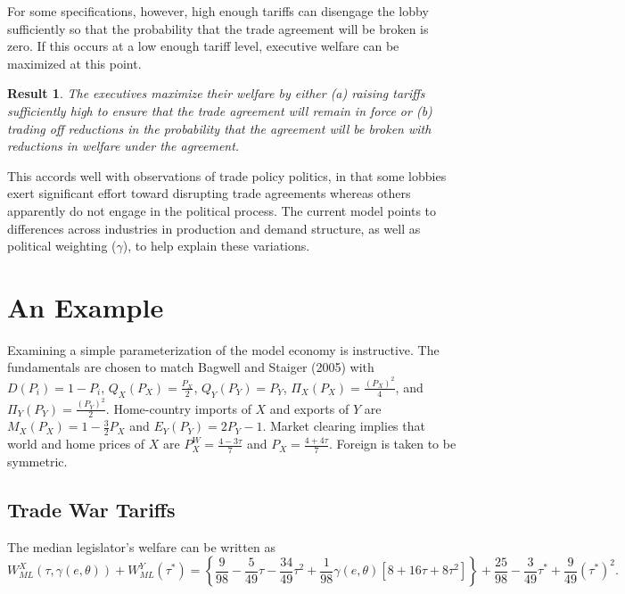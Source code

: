 \documentclass[10pt]{article}
\newtheorem{result}{Result}
\newcommand{\ve}{\theta}
\newcommand{\ga}{\gamma}
\begin{document}
For some specifications, however, high enough tariffs can disengage the lobby sufficiently so that the probability that the trade agreement will be broken is zero. If this occurs at a low enough tariff level, executive welfare can be maximized at this point. 
\begin{result}
  The executives maximize their welfare by either (a) raising tariffs sufficiently high to ensure that the trade agreement will remain in force or (b) trading off reductions in the probability that the agreement will be broken with reductions in welfare under the agreement.
  \label{res:execsoln}
\end{result}
This accords well with observations of trade policy politics, in that some lobbies exert significant effort toward disrupting trade agreements whereas others apparently do not engage in the political process. The current model points to differences across industries in production and demand structure, as well as political weighting ($\ga$), to help explain these variations.


\section{An Example}
\label{sec:example}
Examining a simple parameterization of the model economy is instructive. The fundamentals are chosen to match Bagwell and Staiger (2005) with $D(P_i) = 1 - P_i$, $Q_X(P_X) = \frac{P_X}{2}$, $Q_Y(P_Y) = P_Y$, $\Pi_X(P_X) = \frac{(P_X)^2}{4}$, and $\Pi_Y(P_Y) = \frac{(P_Y)^2}{2}$. Home-country imports of $X$ and exports of $Y$ are $M_X(P_X)= 1 - \frac{3}{2}P_X$ and $E_Y(P_Y)= 2P_Y -1$. Market clearing implies that world and home prices of $X$ are $P_X^W = \frac{4-3\tau}{7}$ and $P_X = \frac{4+4\tau}{7}$. Foreign is taken to be symmetric.

\subsection{Trade War Tariffs}
The median legislator's welfare can be written as 
\[
  W_{\mathit{ML}}^X(\tau,\ga(e,\ve)) + W_{\mathit{ML}}^Y(\tau^*) = \left\{\frac{9}{98} - \frac{5}{49}\tau - \frac{34}{49}\tau^2 +\frac{1}{98}\ga(e,\ve)\left[ 8 + 16\tau + 8\tau^2 \right] \right\}+ \frac{25}{98} - \frac{3}{49}\tau^* + \frac{9}{49}(\tau^*)^2.
\]
\end{document}
